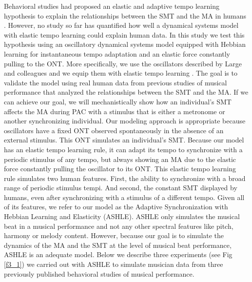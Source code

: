 \documentclass{report}
\begin{document}
Behavioral studies had proposed an elastic and adaptive tempo learning hypothesis to explain the relationships between the SMT and the MA in humans \cite{scheurich2018tapping}. However, no study so far has quantified how well a dynamical systems model with elastic tempo learning could explain human data. In this study we test this hypothesis using an oscillatory dynamical systems model equipped with Hebbian learning for instantaneous tempo adaptation and an elastic force constantly pulling to the ONT. More specifically, we use the oscillators described by Large and colleagues \cite{large2010canonical} and we equip them with elastic tempo learning \cite{righetti2006dynamic, lambert2016adaptive}. The goal is to validate the model using real human data from previous studies of musical performance that analyzed the relationships between the SMT and the MA. If we can achieve our goal, we will mechanistically show how an individual’s SMT affects the MA during PAC with a stimulus that is either a metronome or another synchronizing individual. Our modeling approach is appropriate because oscillators have a fixed ONT observed spontaneously in the absence of an external stimulus. This ONT simulates an individual's SMT. Because our model has an elastic tempo learning rule, it can adapt its tempo to synchronize with a periodic stimulus of any tempo, but always showing an MA due to the elastic force constantly pulling the oscillator to its ONT. This elastic tempo learning rule simulates two human features. First, the ability to synchronize with a broad range of periodic stimulus tempi. And second, the constant SMT displayed by humans, even after synchronizing with a stimulus of a different tempo. Given all of its features, we refer to our model as the Adaptive Synchronization with Hebbian Learning and Elasticity (ASHLE). ASHLE only simulates the musical beat in a musical performance and not any other spectral features like pitch, harmony or melody content. However, because our goal is to simulate the dynamics of the MA and the SMT at the level of musical beat performance, ASHLE is an adequate model. Below we describe three experiments (see Fig \ref{f3_1}) we carried out with ASHLE to simulate musician data from three previously published behavioral studies of musical performance.
\end{document}
